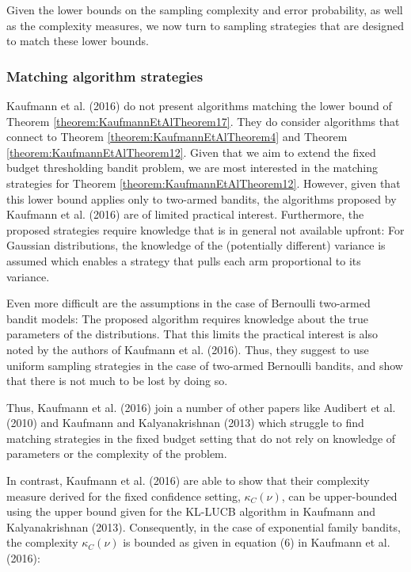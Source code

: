 \documentclass[11pt,]{article}
\begin{document}
Given the lower bounds on the sampling complexity and error probability,
as well as the complexity measures, we now turn to sampling strategies
that are designed to match these lower bounds.

\subsubsection{Matching algorithm
strategies}\label{matching-algorithm-strategies}

Kaufmann et al. (2016) do not present algorithms matching the lower
bound of Theorem \ref{theorem:KaufmannEtAlTheorem17}. They do consider
algorithms that connect to Theorem \ref{theorem:KaufmannEtAlTheorem4}
and Theorem \ref{theorem:KaufmannEtAlTheorem12}. Given that we aim to
extend the fixed budget thresholding bandit problem, we are most
interested in the matching strategies for Theorem
\ref{theorem:KaufmannEtAlTheorem12}. However, given that this lower
bound applies only to two-armed bandits, the algorithms proposed by
Kaufmann et al. (2016) are of limited practical interest. Furthermore,
the proposed strategies require knowledge that is in general not
available upfront: For Gaussian distributions, the knowledge of the
(potentially different) variance is assumed which enables a strategy
that pulls each arm proportional to its variance.

Even more difficult are the assumptions in the case of Bernoulli
two-armed bandit models: The proposed algorithm requires knowledge about
the true parameters of the distributions. That this limits the practical
interest is also noted by the authors of Kaufmann et al. (2016). Thus,
they suggest to use uniform sampling strategies in the case of two-armed
Bernoulli bandits, and show that there is not much to be lost by doing
so.

Thus, Kaufmann et al. (2016) join a number of other papers like Audibert
et al. (2010) and Kaufmann and Kalyanakrishnan (2013) which struggle to
find matching strategies in the fixed budget setting that do not rely on
knowledge of parameters or the complexity of the problem.

In contrast, Kaufmann et al. (2016) are able to show that their
complexity measure derived for the fixed confidence setting,
\(\kappa_C(\nu)\), can be upper-bounded using the upper bound given for
the KL-LUCB algorithm in Kaufmann and Kalyanakrishnan (2013).
Consequently, in the case of exponential family bandits, the complexity
\(\kappa_C(\nu)\) is bounded as given in equation (6) in Kaufmann et al.
(2016):
\end{document}
